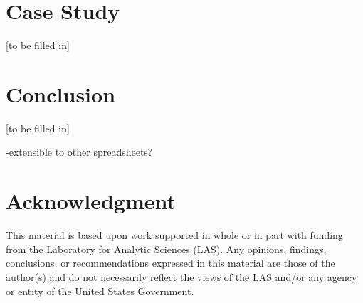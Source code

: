 \documentclass[conference]{IEEEtran}
\begin{document}
\section{Case Study}

[to be filled in]

\section{Conclusion}

[to be filled in]

-extensible to other spreadsheets?


\section*{Acknowledgment}
This material is based upon work supported in whole or in part with funding from the Laboratory for Analytic Sciences (LAS). Any opinions, findings, conclusions, or recommendations expressed in this material are those of the author(s) and do not necessarily reflect the views of the LAS and/or any agency or entity of the United States Government.




%
%
%
%




\end{document}
